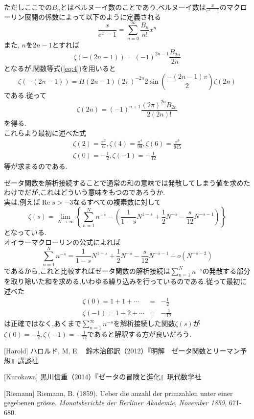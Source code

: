 ただしここでの$B_n$とはベルヌーイ数のことであり,ベルヌーイ数は$\frac{x}{e^x-1}$のマクローリン展開の係数によって以下のように定義される\\ 
\[
\frac{x}{e^x-1} = \sum_{n=0}^{\infty} \frac{B_n}{n!} x^n
\]
また, $n$を$2n-1$とすれば
\[
\zeta(-(2n-1))=(-1)^{2n-1}\frac{B_{2n}}{2n}
\]
となるが,関数等式(\ref{eq:4})を用いると
\[
\zeta(-(2n-1))=\Pi(2n-1)(2\pi)^{-2n}2\sin\left(\frac{-(2n-1)\pi}{2}\right)\zeta(2n)
\]
である.従って
\[
\zeta(2n)=(-1)^{n+1}\frac{(2\pi)^{2n}B_{2n}}{2(2n)!}
\]
を得る.\\
これらより最初に述べた式
\begin{eqnarray*}
\zeta(2)=\frac{\pi^2}{6}, \zeta(4)=\frac{\pi^4}{90}, \zeta(6)=\frac{\pi^6}{945}\\
\zeta(0)=-\frac{1}{2}, \zeta(-1)=-\frac{1}{12}
\end{eqnarray*}
等が求まるのである.

ゼータ関数を解析接続することで通常の和の意味では発散してしまう値を求めたわけでだが,これはどういう意味をもつのであろうか.\\
実は,例えば$\operatorname{Re} s>-3$なるすべての複素数に対して
\[
\zeta(s)=\lim_{N\to\infty}\left\{\sum_{n=1}^N n^{-s}-\left(\frac{1}{1-s}N^{1-s}+\frac{1}{2}N^{-s}-\frac{s}{12}N^{-s-1}\right)\right\}
\]
となっている.\\
オイラーマクローリンの公式によれば
\[
\sum_{n=1}^N n^{-s}=\frac{1}{1-s}N^{1-s}+\frac{1}{2}N^{-s}-\frac{s}{12}N^{-s-1}+o(N^{-s-2})
\]
であるから,これと比較すればゼータ関数の解析接続は$\sum_{n=1}^N n^{-s}$の発散する部分を取り除いた和を求める,いわゆる繰り込みを行っているのである.従って最初に述べた
\begin{eqnarray*}
\zeta(0)=1+1+\cdots &=& -\frac{1}{2}\\
\zeta(-1)=1+2+\cdots &=& -\frac{1}{12}
\end{eqnarray*}
は正確ではなく,あくまで$\sum_{n=1}^\infty n^{-s}$を解析接続した関数$\zeta(s)$が$\zeta(0)=-\frac{1}{2},\zeta(-1)=-\frac{1}{12}$であると解釈する方が良いだろう.
\begin{description}
\item{[Harold]} ハロルド, M, E.　鈴木治郎訳（2012）『明解　ゼータ関数とリーマン予想』講談社
\item{[Kurokawa]} 黒川信重（2014）『ゼータの冒険と進化』現代数学社
\item{[Riemann]} Riemann, B. (1859). Ueber die anzahl der primzahlen unter einer gegebenen gr\"{o}sse. \textit{Monatsberichte der Berliner Akademie}, \textit{November 1859}, 671-680.
\end{description}

